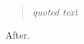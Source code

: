 \documentclass{article}
\begin{document}
\begin{quote}\em quoted text\end{quote} After.
\end{document}
